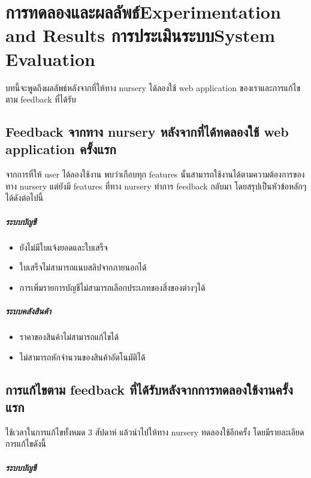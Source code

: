 \chapter{\ifproject%
\ifcpe การทดลองและผลลัพธ์\else Experimentation and Results\fi
\else%
\ifcpe การประเมินระบบ\else System Evaluation\fi
\fi}
บทนี้จะพูดถึงผลลัพธ์หลังจากที่ให้ทาง nursery ได้ลองใช้ web application ของเราและการแก้ไขตาม feedback ที่ได้รับ 
\section{Feedback จากทาง nursery หลังจากที่ได้ทดลองใช้ web application ครั้งแรก}
จากการที่ให้ user ได้ลองใช้งาน พบว่าเกือบทุก features นั้นสามารถใช้งานได้ตามความต้องการของทาง nursery แต่ยังมี features ที่ทาง nursery ทำการ feedback กลับมา โดยสรุปเป็นหัวข้อหลักๆ ได้ดังต่อไปนี้
\paragraph{ระบบบัญชี}
\begin{itemize}
    \item ยังไม่มีใบแจ้งยอดและใบเสร็จ
    \item ใบเสร็จไม่สามารถแนบสลิปจากภายนอกได้
    \item การเพิ่มรายการบัญชีไม่สามารถเลือกประเภทของสิ่งของต่างๆได้ 
\end{itemize}
\paragraph{ระบบคลังสินค้า}
\begin{itemize}
    \item ราคาของสินค้าไม่สามารถแก้ไขได้
    \item ไม่สามารถหักจำนวนของสินค้าอัตโนมัติได้
\end{itemize}

\section{การแก้ไขตาม feedback ที่ได้รับหลังจากการทดลองใช้งานครั้งแรก}
ใช้เวลาในการแก้ไขทั้งหมด 3 สัปดาห์ แล้วนำไปให้ทาง nursery ทดลองใช้อีกครั้ง โดยมีรายละเอียดการแก้ไขดังนี้
\paragraph{ระบบบัญชี}

